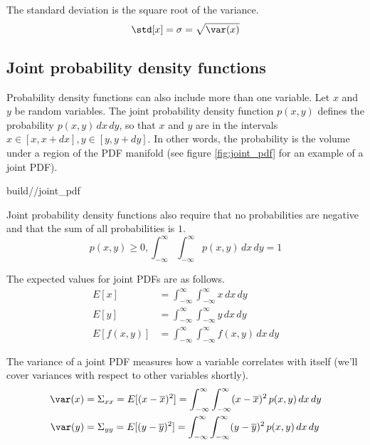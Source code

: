 The standard deviation is the square root of the variance.
\begin{equation*}
  \std[x] = \sigma = \sqrt{\var(x)}
\end{equation*}

\subsection{Joint probability density functions}

Probability density functions can also include more than one variable. Let $x$
and $y$ be random variables. The joint probability density function $p(x, y)$
defines the probability $p(x, y) \,dx \,dy$, so that $x$ and $y$ are in the
intervals $x \in [x, x + dx], y \in [y, y + dy]$. In other words, the
probability is the volume under a region of the PDF manifold (see figure
\ref{fig:joint_pdf} for an example of a joint PDF).
\begin{svg}{build/\chapterpath/joint_pdf}
  \caption{Joint probability density function}
  \label{fig:joint_pdf}
\end{svg}

Joint probability density functions also require that no probabilities are
negative and that the sum of all probabilities is $1$.
\begin{equation*}
  p(x, y) \geq 0, \int_{-\infty}^\infty \int_{-\infty}^{\infty} p(x, y) \,dx
    \,dy = 1
\end{equation*}

The expected values for joint PDFs are as follows.
\begin{align*}
  E[x] &= \int_{-\infty}^\infty \int_{-\infty}^{\infty} x \,dx \,dy \\
  E[y] &= \int_{-\infty}^\infty \int_{-\infty}^{\infty} y \,dx \,dy \\
  E[f(x, y)] &= \int_{-\infty}^\infty \int_{-\infty}^{\infty} f(x, y) \,dx \,dy
\end{align*}

The variance of a joint PDF measures how a variable correlates with itself
(we'll cover variances with respect to other variables shortly).
\begin{align*}
  \var(x) &= \Sigma_{xx} = E[(x - \overline{x})^2] =
    \int_{-\infty}^\infty \int_{-\infty}^\infty (x - \overline{x})^2 \,p(x, y)
    \,dx \,dy \\
  \var(y) &= \Sigma_{yy} = E[(y - \overline{y})^2] =
    \int_{-\infty}^\infty \int_{-\infty}^\infty (y - \overline{y})^2 \,p(x, y)
    \,dx \,dy \\
\end{align*}

